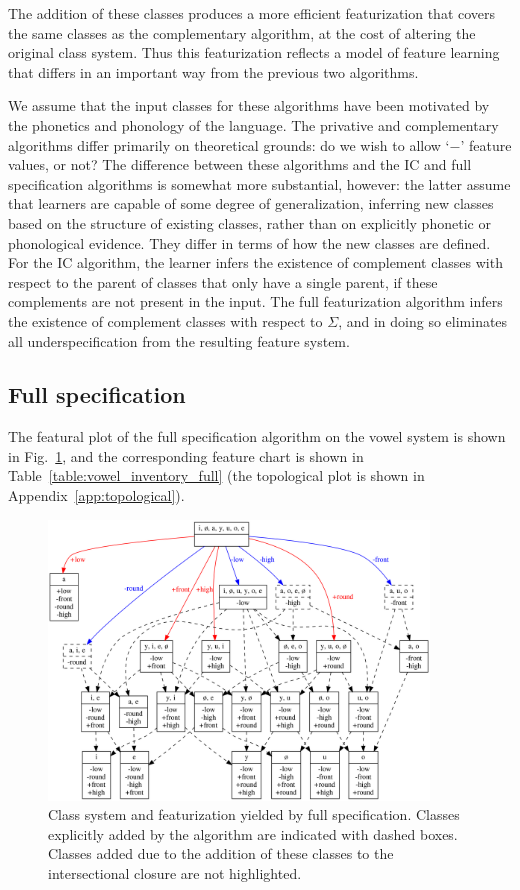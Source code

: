 \documentclass[12pt, oneside]{article}   	%
\begin{document}
The addition of these classes produces a more efficient featurization that covers the same classes as the complementary algorithm, at the cost of altering the original class system. Thus this featurization reflects a model of feature learning that differs in an important way from the previous two algorithms.

We assume that the input classes for these algorithms have been motivated by the phonetics and phonology of the language. The privative and complementary algorithms differ primarily on theoretical grounds: do we wish to allow `$-$' feature values, or not? The difference between these algorithms and the IC and full specification algorithms is somewhat more substantial, however: the latter assume that learners are capable of some degree of generalization, inferring new classes based on the structure of existing classes, rather than on explicitly phonetic or phonological evidence. They differ in terms of how the new classes are defined. For the IC algorithm, the learner infers the existence of complement classes with respect to the parent of classes that only have a single parent, if these complements are not present in the input. The full featurization algorithm infers the existence of complement classes with respect to $\Sigma$, and in doing so eliminates all underspecification from the resulting feature system.

\subsection{Full specification}

The featural plot of the full specification algorithm on the vowel system is shown in Fig.~\ref{fig:vowel_inventory_full}, and the corresponding feature chart is shown in Table~\ref{table:vowel_inventory_full} (the topological plot is shown in Appendix~\ref{app:topological}).

\begin{figure}[htb!]
	\centering
	\includegraphics[width=0.9\textwidth]{vowel_inventory_full_FEATURAL.png}
	\caption{Class system and featurization yielded by full specification.  Classes explicitly added by the algorithm are indicated with dashed boxes. Classes added due to the addition of these classes to the intersectional closure are not highlighted.}
	\label{fig:vowel_inventory_full}
\end{figure}
\end{document}
